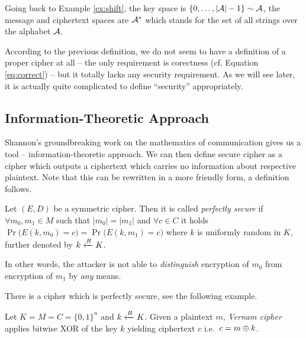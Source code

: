 \begin{note}
	Going back to Example \ref{ex:shift}, the key space is $\{0 , \ldots , |{\cal A}|-1\}\sim\cal A$, the message and ciphertext spaces are ${\cal A}^*$ which stands for the set of all strings over the alphabet $\cal A$.
\end{note}

According to the previous definition, we do not seem to have a definition of a proper cipher at all -- the only requirement is corectness (cf. Equation \ref{eq:correct}) -- but it totally lacks any security requirement. As we will see later, it is actually quite complicated to define ``security'' appropriately.



\subsection{Information-Theoretic Approach}

Shannon's groundbreaking work \cite{shannon1949mathematical} on the mathematics of communication gives us a tool -- information-theoretic approach. We can then define secure cipher as a cipher which outputs a ciphertext which carries no information about respective plaintext. Note that this can be rewritten in a more friendly form, a definition follows.

\begin{defn}
\label{def:perfsec}
	Let $(E,D)$ be a symmetric cipher. Then it is called {\em perfectly secure} if $\forall m_0,m_1\in M$ such that $|m_0| = |m_1|$ and $\forall c\in C$ it holds $\Pr\bigl(E(k,m_0)=c\bigr) = \Pr\bigl(E(k,m_1)=c\bigr)$ where $k$ is uniformly random in $K$, further denoted by $k\xleftarrow{R} K$.
\end{defn}

\begin{note}
\label{note:indist}
	In other words, the attacker is not able to {\em distinguish} encryption of $m_0$ from encryption of $m_1$ by {\em any} means.
\end{note}

There is a cipher which is perfectly secure, see the following example.

\begin{example}
	Let $K = M = C = \{0,1\}^n$ and $k\xleftarrow{R} K$. Given a plaintext $m$, {\em Vernam cipher} applies bitwise XOR of the key $k$ yielding ciphertext $c$ i.e.\ $c = m\oplus k$.
\end{example}

